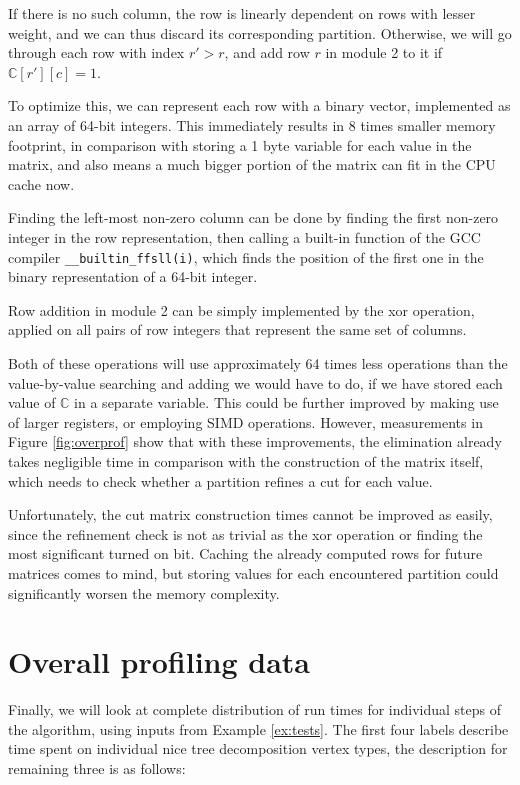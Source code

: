 \documentclass[thesis=M,english,hidelinks]{FITthesis}[2012/10/20]
\theoremstyle{definition}
\begin{document}
If there is no such column, the row is linearly dependent on rows with lesser weight, and we can thus discard its
corresponding partition. Otherwise, we will go through each row with index $r' > r$, and add row $r$ in module 2 to it
if $\mathbb{C}[r'][c] = 1$.

To optimize this, we can represent each row with a binary vector, implemented as an array of 64-bit integers. This
immediately results in 8 times smaller memory footprint, in comparison with storing a 1 byte variable for each value in
the matrix, and also means a much bigger portion of the matrix can fit in the CPU cache now.

Finding the left-most non-zero column can be done by finding the first non-zero integer in the row representation, then
calling a built-in function of the GCC compiler \cite{gcc} \texttt{\_\_builtin\_ffsll(i)}, which finds the position of
the first one in the binary representation of a 64-bit integer.

Row addition in module 2 can be simply implemented by the xor operation, applied on all pairs of row integers that
represent the same set of columns.

Both of these operations will use approximately 64 times less operations than the value-by-value searching and
adding we would have to do, if we have stored each value of $\mathbb{C}$ in a separate variable. This could be further
improved by making use of larger registers, or employing SIMD operations. However, measurements in Figure
\ref{fig:overprof} show that with these improvements, the elimination already takes negligible time in comparison with
the construction of the matrix itself, which needs to check whether a partition refines a cut for each value.

Unfortunately, the cut matrix construction times cannot be improved as easily, since the refinement check is not as
trivial as the xor operation or finding the most significant turned on bit. Caching the already computed rows for future
matrices comes to mind, but storing values for each encountered partition could significantly worsen the memory
complexity.

\section{Overall profiling data}

Finally, we will look at complete distribution of run times for individual steps of the algorithm, using inputs from Example
\ref{ex:tests}. The first four labels describe time spent on individual nice tree decomposition vertex types, the
description for remaining three is as follows:
\end{document}
